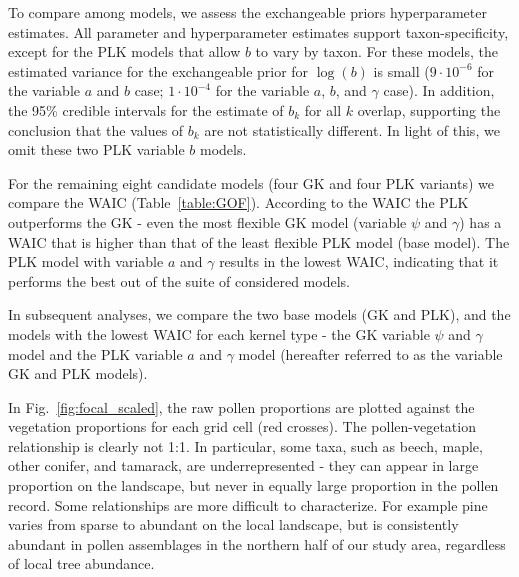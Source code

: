 \documentclass[12pt]{article}
\begin{document}
To compare among models, we assess the exchangeable priors
hyperparameter estimates. All parameter and hyperparameter estimates
support taxon-specificity, except for the PLK models that allow $b$ to
vary by taxon. For these models, the estimated variance for the
exchangeable prior for $\log ( b )$ is small ($9\cdot 10^{-6}$ for the
variable $a$ and $b$ case; $1\cdot 10^{-4}$ for the variable $a$, $b$,
and $\gamma$ case). In addition, the 95\% credible intervals for the
estimate of $b_k$ for all $k$ overlap, supporting the conclusion that
the values of $b_k$ are not statistically different. In light of this,
we omit these two PLK variable $b$ models.

For the remaining eight candidate models (four GK and four PLK
variants) we compare the WAIC (Table~\ref{table:GOF}). According to
the WAIC the PLK outperforms the GK - even the most flexible GK model
(variable $\psi$ and $\gamma$) has a WAIC that is higher than that of
the least flexible PLK model (base model). The PLK model with variable
$a$ and $\gamma$ results in the lowest WAIC, indicating that it
performs the best out of the suite of considered models.

In subsequent analyses, we compare the two base models (GK and PLK),
and the models with the lowest WAIC for each kernel type - the GK
variable $\psi$ and $\gamma$ model and the PLK variable $a$ and
$\gamma$ model (hereafter referred to as the variable GK and PLK
models).

In Fig.~\ref{fig:focal_scaled}, the raw pollen proportions are plotted
against the vegetation proportions for each grid cell (red
crosses). The pollen-vegetation relationship is clearly not 1:1. In
particular, some taxa, such as beech, maple, other conifer, and
tamarack, are underrepresented - they can appear in large proportion
on the landscape, but never in equally large proportion in the pollen
record. Some relationships are more difficult to characterize. For
example pine varies from sparse to abundant on the local landscape,
but is consistently abundant in pollen assemblages in the northern
half of our study area, regardless of local tree abundance.
\end{document}
